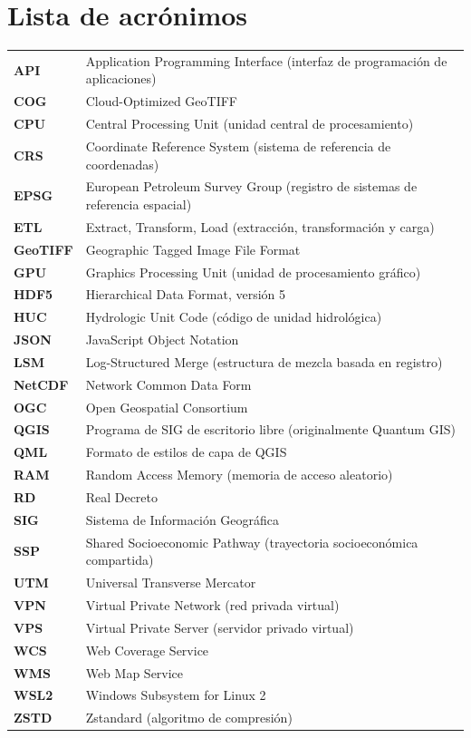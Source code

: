 \chapter*{Lista de acrónimos}

\begingroup
\renewcommand{\arraystretch}{1.25}
\begin{longtable}{>{\bfseries}l p{12.5cm}}
API & Application Programming Interface (interfaz de programación de aplicaciones) \\
COG & Cloud-Optimized GeoTIFF \\
CPU & Central Processing Unit (unidad central de procesamiento) \\
CRS & Coordinate Reference System (sistema de referencia de coordenadas) \\
EPSG & European Petroleum Survey Group (registro de sistemas de referencia espacial) \\
ETL & Extract, Transform, Load (extracción, transformación y carga) \\
GeoTIFF & Geographic Tagged Image File Format \\
GPU & Graphics Processing Unit (unidad de procesamiento gráfico) \\
HDF5 & Hierarchical Data Format, versión 5 \\
HUC & Hydrologic Unit Code (código de unidad hidrológica) \\
JSON & JavaScript Object Notation \\
LSM & Log-Structured Merge (estructura de mezcla basada en registro) \\
NetCDF & Network Common Data Form \\
OGC & Open Geospatial Consortium \\
QGIS & Programa de SIG de escritorio libre (originalmente Quantum GIS) \\
QML & Formato de estilos de capa de QGIS \\
RAM & Random Access Memory (memoria de acceso aleatorio) \\
RD & Real Decreto \\
SIG & Sistema de Información Geográfica \\
SSP & Shared Socioeconomic Pathway (trayectoria socioeconómica compartida) \\
UTM & Universal Transverse Mercator \\
VPN & Virtual Private Network (red privada virtual) \\
VPS & Virtual Private Server (servidor privado virtual) \\
WCS & Web Coverage Service \\
WMS & Web Map Service \\
WSL2 & Windows Subsystem for Linux 2 \\
ZSTD & Zstandard (algoritmo de compresión) \\
\end{longtable}
\endgroup
